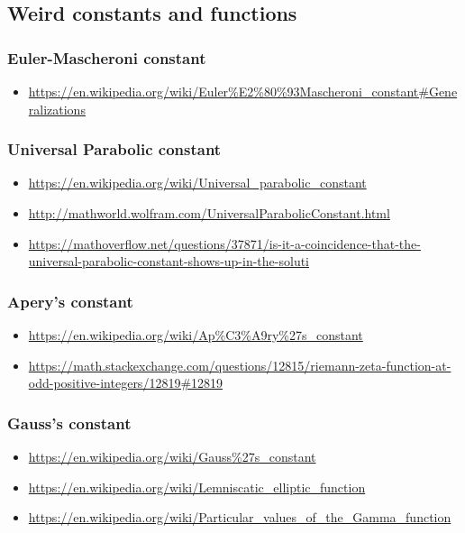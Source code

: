 \subsection{Weird constants and functions}

\subsubsection{Euler-Mascheroni constant}
\begin{itemize}
\item \url{https://en.wikipedia.org/wiki/Euler\%E2\%80\%93Mascheroni_constant#Generalizations}
\end{itemize}

\subsubsection{Universal Parabolic constant}
\begin{itemize}
\item \url{https://en.wikipedia.org/wiki/Universal_parabolic_constant}
\item \url{http://mathworld.wolfram.com/UniversalParabolicConstant.html}
\item \url{https://mathoverflow.net/questions/37871/is-it-a-coincidence-that-the-universal-parabolic-constant-shows-up-in-the-soluti}
\end{itemize}

\subsubsection{Apery's constant}
\begin{itemize}
\item \url{https://en.wikipedia.org/wiki/Ap%C3%A9ry%27s_constant}
\item \url{https://math.stackexchange.com/questions/12815/riemann-zeta-function-at-odd-positive-integers/12819#12819}
\end{itemize}

\subsubsection{Gauss's constant}
\begin{itemize}
\item \url{https://en.wikipedia.org/wiki/Gauss\%27s_constant}
\item \url{https://en.wikipedia.org/wiki/Lemniscatic_elliptic_function}
\item \url{https://en.wikipedia.org/wiki/Particular_values_of_the_Gamma_function}
\end{itemize}

